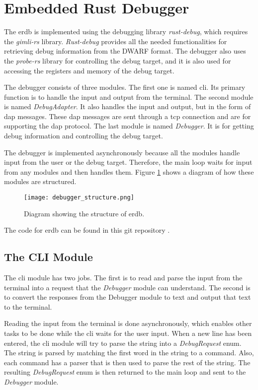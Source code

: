 \section{Embedded Rust Debugger}
The \acrfull{erdb} is implemented using the debugging library \emph{rust-debug}, which requires the \emph{gimli-rs} library.
\emph{Rust-debug} provides all the needed functionalities for retrieving debug information from the \gls{DWARF} format.
The debugger also uses the \emph{probe-rs} library for controlling the debug target, and it is also used for accessing the registers and memory of the debug target.


The debugger consists of three modules.
The first one is named \acrshort{cli}.
Its primary function is to handle the input and output from the terminal.
The second module is named \emph{DebugAdapter}.
It also handles the input and output, but in the form of \gls{dap} messages.
These \gls{dap} messages are sent through a \acrshort{tcp} connection and are for supporting the \gls{dap} protocol.
The last module is named \emph{Debugger}.
It is for getting debug information and controlling the debug target.


The debugger is implemented asynchronously because all the modules handle input from the user or the debug target.
Therefore, the main loop waits for input from any modules and then handles them.
Figure \ref{fig:ERDStruct} shows a diagram of how these modules are structured.


\begin{figure}[h]
	\centering
	\texttt{[image: debugger\_structure.png]}
	\caption{Diagram showing the structure of \gls{erdb}.}
	\label{fig:ERDStruct}
\end{figure}


The code for \gls{erdb} can be found in this git repository \cite{erdb}.


\subsection{The CLI Module} 
The \acrshort{cli} module has two jobs.
The first is to read and parse the input from the terminal into a request that the \emph{Debugger} module can understand.
The second is to convert the responses from the Debugger module to text and output that text to the terminal.


Reading the input from the terminal is done asynchronously, which enables other tasks to be done while the \acrshort{cli} waits for the user input.
When a new line has been entered, the \acrshort{cli} module will try to parse the string into a \emph{DebugRequest} enum.
The string is parsed by matching the first word in the string to a command.
Also, each command has a parser that is then used to parse the rest of the string.
The resulting \emph{DebugRequest} enum is then returned to the main loop and sent to the \emph{Debugger} module.


